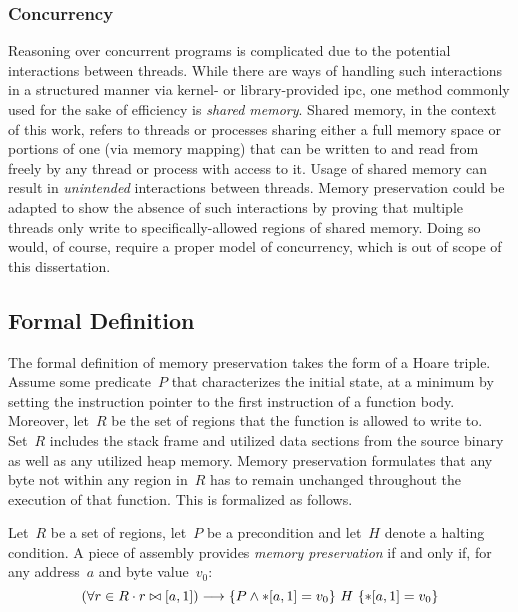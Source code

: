 \subsubsection{Concurrency}
Reasoning over concurrent programs is complicated
due to the potential interactions between threads.
While there are ways of handling such interactions in a structured manner
via kernel- or library-provided \ac{ipc},
one method commonly used for the sake of efficiency is \emph{shared memory}.
Shared memory, in the context of this work,
refers to threads or processes sharing either a full memory space
or portions of one (via memory mapping)
that can be written to and read from freely by any thread or process with access to it.
Usage of shared memory can result in \emph{unintended} interactions between threads.
Memory preservation could be adapted to show the absence of such interactions
by proving that multiple threads only write
to specifically-allowed regions of shared memory.
Doing so would, of course, require a proper model of concurrency,
which is out of scope of this dissertation.

\subsection{Formal Definition}
The formal definition of memory preservation takes the form of a Hoare triple.
Assume some predicate~$P$ that characterizes the initial state, at a minimum
by setting the instruction pointer to the first instruction of a function body.
Moreover, let~$R$ be the set of regions that the function is allowed to write to.
Set~$R$ includes the stack frame and utilized data sections from the source binary
as well as any utilized heap memory.
Memory preservation formulates that any byte not within any region in~$R$ has to remain unchanged throughout the execution of that function.
This is formalized as follows.
\begin{definition}
  Let~$R$ be a set of regions, let~$P$ be a precondition and let~$H$ denote a halting condition.
  A piece of assembly provides \emph{memory preservation} if and only if, for any address~$a$ and byte value~$v_0$:
  \begin{equation}
  (\forall r\in R\cdot r\bowtie[a,1])\longrightarrow\{P\wedge \ast[a,1]=v_0\}~H~\{\ast[a,1]=v_0\}
  \end{equation}
\end{definition}

